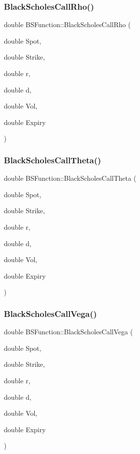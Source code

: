\subsubsection{\texorpdfstring{Black\+Scholes\+Call\+Rho()}{BlackScholesCallRho()}}
{\footnotesize\ttfamily double B\+S\+Function\+::\+Black\+Scholes\+Call\+Rho (\begin{DoxyParamCaption}\item[{double}]{Spot,  }\item[{double}]{Strike,  }\item[{double}]{r,  }\item[{double}]{d,  }\item[{double}]{Vol,  }\item[{double}]{Expiry }\end{DoxyParamCaption})}

\hypertarget{namespaceBSFunction_a41430f735c335bd049ccfb8ad0cab08d}{}\label{namespaceBSFunction_a41430f735c335bd049ccfb8ad0cab08d} 
\subsubsection{\texorpdfstring{Black\+Scholes\+Call\+Theta()}{BlackScholesCallTheta()}}
{\footnotesize\ttfamily double B\+S\+Function\+::\+Black\+Scholes\+Call\+Theta (\begin{DoxyParamCaption}\item[{double}]{Spot,  }\item[{double}]{Strike,  }\item[{double}]{r,  }\item[{double}]{d,  }\item[{double}]{Vol,  }\item[{double}]{Expiry }\end{DoxyParamCaption})}

\hypertarget{namespaceBSFunction_a12a711cab3ec1d88ac6e59d9538718ca}{}\label{namespaceBSFunction_a12a711cab3ec1d88ac6e59d9538718ca} 
\subsubsection{\texorpdfstring{Black\+Scholes\+Call\+Vega()}{BlackScholesCallVega()}}
{\footnotesize\ttfamily double B\+S\+Function\+::\+Black\+Scholes\+Call\+Vega (\begin{DoxyParamCaption}\item[{double}]{Spot,  }\item[{double}]{Strike,  }\item[{double}]{r,  }\item[{double}]{d,  }\item[{double}]{Vol,  }\item[{double}]{Expiry }\end{DoxyParamCaption})}


